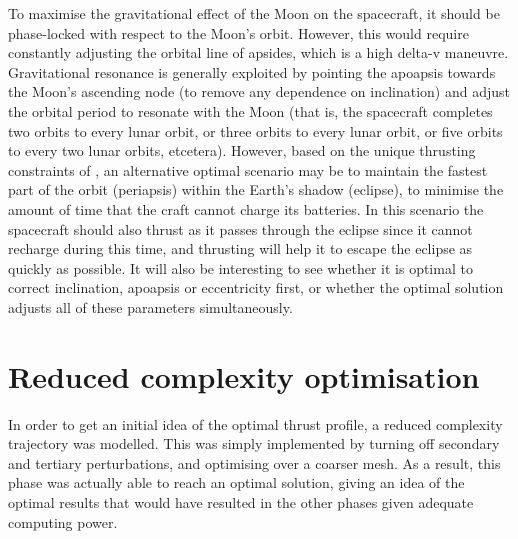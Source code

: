 To maximise the gravitational effect of the Moon on the spacecraft, it should be phase-locked with respect to the Moon's orbit. However, this would require constantly adjusting the orbital line of apsides, which is a high delta-v maneuvre. Gravitational resonance is generally exploited by pointing the apoapsis towards the Moon's ascending node (to remove any dependence on inclination) and adjust the orbital period to resonate with the Moon (that is, the spacecraft completes two orbits to every lunar orbit, or three orbits to every lunar orbit, or five orbits to every two lunar orbits, etcetera). However, based on the unique thrusting constraints of \BW, an alternative optimal scenario may be to maintain the fastest part of the orbit (periapsis) within the Earth's shadow (eclipse), to minimise the amount of time that the craft cannot charge its batteries. In this scenario the spacecraft should also thrust as it passes through the eclipse since it cannot recharge during this time, and thrusting will help it to escape the eclipse as quickly as possible. It will also be interesting to see whether it is optimal to correct inclination, apoapsis or eccentricity first, or whether the optimal solution adjusts all of these parameters simultaneously.
 

 

\section{Reduced complexity optimisation} \label{sec:Reduced-complexity}

In order to get an initial idea of the optimal thrust profile, a reduced complexity trajectory was modelled. This was simply implemented by turning off secondary and tertiary perturbations, and optimising over a coarser mesh. As a result, this phase was actually able to reach an optimal solution, giving an idea of the optimal results that would have resulted in the other phases given adequate computing power.

